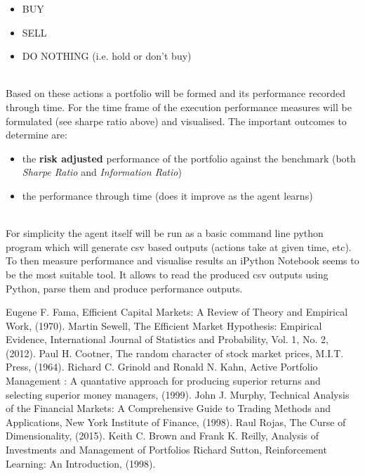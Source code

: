 \documentclass[dvips,12pt]{article}
\begin{document}
\begin{itemize}
	\item BUY
	\item SELL
	\item DO NOTHING (i.e. hold or don't buy)
\end{itemize}
~\\
Based on these actions a portfolio will be formed and its performance recorded through time. For the time frame of the execution performance measures will be formulated (see sharpe ratio above) and visualised. The important outcomes to determine are:

\begin{itemize}
	\item the \textbf{risk adjusted} performance of the portfolio against the benchmark (both \emph{Sharpe Ratio} and \emph{Information Ratio})
	\item the performance through time (does it improve as the agent learns)
\end{itemize}
~\\
For simplicity the agent itself will be run as a basic command line python program which will generate csv based outputs (actions take at given time, etc). To then measure performance and visualise results an iPython Notebook seems to be the most suitable tool. It allows to read the produced csv outputs using Python, parse them and produce performance outputs.
 
\begin{thebibliography}{99}

 Eugene F. Fama,
{Efficient Capital Markets: A Review of Theory and Empirical Work}, (1970).
 Martin Sewell,
{The Efficient Market Hypothesis: Empirical Evidence}, 
International Journal of Statistics and Probability, Vol. 1, No. 2, (2012).
 Paul H. Cootner,
{The random character of stock market prices},
M.I.T. Press, (1964).
 Richard C. Grinold and Ronald N. Kahn,
{Active Portfolio Management : A quantative approach for producing superior returns and selecting superior money managers}, (1999).
 John J. Murphy,
{Technical Analysis of the Financial Markets: A Comprehensive Guide to Trading Methods and Applications},
New York Institute of Finance, (1998).
 Raul Rojas,
{The Curse of Dimensionality}, (2015).
 Keith C. Brown and Frank K. Reilly,
{Analysis of Investments and Management of Portfolios}
 Richard Sutton,
{Reinforcement Learning: An Introduction}, (1998).
\end{thebibliography}
\end{document}
